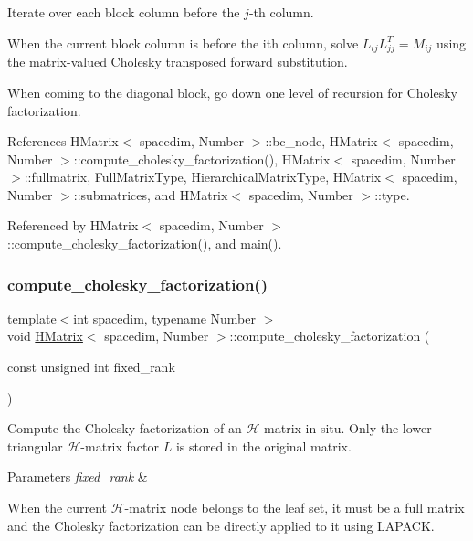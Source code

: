 Iterate over each block column before the $j$-\/th column.

When the current block column is before the i\textquotesingle{}th column, solve $L_{ij} L_{jj}^T = M_{ij}$ using the matrix-\/valued Cholesky transposed forward substitution.

When coming to the diagonal block, go down one level of recursion for Cholesky factorization.

References H\+Matrix$<$ spacedim, Number $>$\+::bc\+\_\+node, H\+Matrix$<$ spacedim, Number $>$\+::compute\+\_\+cholesky\+\_\+factorization(), H\+Matrix$<$ spacedim, Number $>$\+::fullmatrix, Full\+Matrix\+Type, Hierarchical\+Matrix\+Type, H\+Matrix$<$ spacedim, Number $>$\+::submatrices, and H\+Matrix$<$ spacedim, Number $>$\+::type.



Referenced by H\+Matrix$<$ spacedim, Number $>$\+::compute\+\_\+cholesky\+\_\+factorization(), and main().

\mbox{\label{classHMatrix_abc6e787e46fb082579b2d3aea1ad54f6}} 
\subsubsection{\texorpdfstring{compute\+\_\+cholesky\+\_\+factorization()}{compute\_cholesky\_factorization()}\hspace{0.1cm}{\footnotesize\ttfamily [2/2]}}
{\footnotesize\ttfamily template$<$int spacedim, typename Number $>$ \\
void \hyperlink{classHMatrix}{H\+Matrix}$<$ spacedim, Number $>$\+::compute\+\_\+cholesky\+\_\+factorization (\begin{DoxyParamCaption}\item[{const unsigned int}]{fixed\+\_\+rank }\end{DoxyParamCaption})}

Compute the Cholesky factorization of an $\mathcal{H}$-\/matrix in situ. Only the lower triangular $\mathcal{H}$-\/matrix factor $L$ is stored in the original matrix.


\begin{DoxyParams}{Parameters}
{\em fixed\+\_\+rank} & \\
\hline
\end{DoxyParams}
When the current $\mathcal{H}$-\/matrix node belongs to the leaf set, it must be a full matrix and the Cholesky factorization can be directly applied to it using L\+A\+P\+A\+CK.

